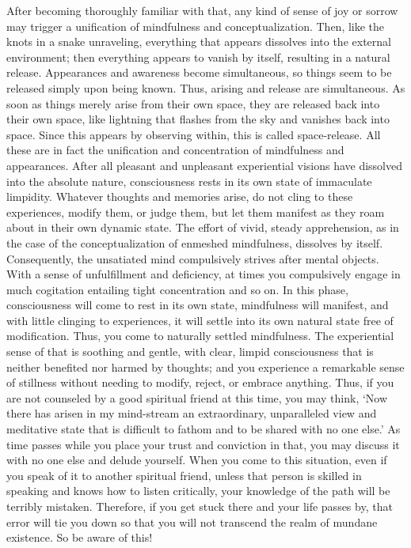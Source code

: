 \documentclass[a4paper,11pt,twoside,final]{book}
\begin{document}
After becoming thoroughly familiar with that, any kind of sense of joy
or sorrow may trigger a unification of mindfulness and
conceptualization. Then, like the knots in a snake unraveling,
everything that appears dissolves into the external environment; then
everything appears to vanish by itself, resulting in a natural
release. Appearances and awareness become simultaneous, so things seem
to be released simply upon being known. Thus, arising and release are
simultaneous. As soon as things merely arise from their own space,
they are released back into their own space, like lightning that
flashes from the sky and vanishes back into space. Since this appears
by observing within, this is called space-release. All these are in
fact the unification and concentration of mindfulness and appearances.
After all pleasant and unpleasant experiential visions have dissolved
into the absolute nature, consciousness rests in its own state of
immaculate limpidity.  Whatever thoughts and memories arise, do not
cling to these experiences, modify them, or judge them, but let them
manifest as they roam about in their own dynamic state. The effort of
vivid, steady apprehension, as in the case of the conceptualization of
enmeshed mindfulness, dissolves by itself.  Consequently, the
unsatiated mind compulsively strives after mental objects.  With a
sense of unfulfillment and deficiency, at times you compulsively
engage in much cogitation entailing tight concentration and so on. In
this phase, consciousness will come to rest in its own state,
mindfulness will manifest, and with little clinging to experiences, it
will settle into its own natural state free of modification. Thus, you
come to naturally settled mindfulness.  The experiential sense of that
is soothing and gentle, with clear, limpid consciousness that is
neither benefited nor harmed by thoughts; and you experience a
remarkable sense of stillness without needing to modify, reject, or
embrace anything. Thus, if you are not counseled by a good spiritual
friend at this time, you may think, `Now there has arisen in my
mind-stream an extraordinary, unparalleled view and meditative state
that is difficult to fathom and to be shared with no one else.' As
time passes while you place your trust and conviction in that, you may
discuss it with no one else and delude yourself. When you come to this
situation, even if you speak of it to another spiritual friend, unless
that person is skilled in speaking and knows how to listen critically,
your knowledge of the path will be terribly mistaken.  Therefore, if
you get stuck there and your life passes by, that error will tie you
down so that you will not transcend the realm of mundane existence. So
be aware of this!
\end{document}
